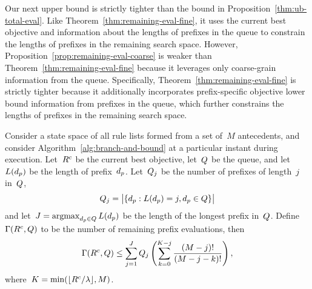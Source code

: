 \begin{arxiv}

Our next upper bound is strictly tighter than the bound in
Proposition~\ref{thm:ub-total-eval}.
%
Like Theorem~\ref{thm:remaining-eval-fine}, it uses the
current best objective and information about
the lengths of prefixes in the queue to constrain
the lengths of prefixes in the remaining search space.
%
However, Proposition~\ref{prop:remaining-eval-coarse}
is weaker than Theorem~\ref{thm:remaining-eval-fine} because
it leverages only coarse-grain information from the queue.
%
Specifically, Theorem~\ref{thm:remaining-eval-fine} is
strictly tighter because it additionally incorporates
prefix-specific objective lower bound information from
prefixes in the queue, which further constrains
the lengths of prefixes in the remaining search space.

\begin{proposition}
\label{prop:remaining-eval-coarse}
Consider a state space of all rule lists formed from a set of~$M$ antecedents,
and consider Algorithm~\ref{alg:branch-and-bound} at a particular instant
during execution.
%
Let~${R^c}$ be the current best objective, let~$Q$ be the queue,
and let~$L(d_p)$ be the length of prefix~$d_p$.
%
Let~$Q_j$ be the number of prefixes of length~$j$ in~$Q$,
\begin{align}
Q_j = \big | \{ d_p : L(d_p) = j, d_p \in Q \} \big |
\end{align}
and let~${J = \operatorname*{argmax}_{d_p \in Q} L(d_p)}$
be the length of the longest prefix in~$Q$.
%
Define~${\Gamma({R^c}, Q)}$ to be the number of remaining
prefix evaluations, then
\begin{align}
\Gamma({R^c}, Q)
\le \sum_{j=1}^J Q_j \left( \sum_{k=0}^{K-j} \frac{(M-j)!}{(M-j - k)!} \right),
\end{align}
where~${K = \min(\lfloor {R^c} / {\lambda} \rfloor, M)}$.
\end{proposition}


\end{arxiv}
